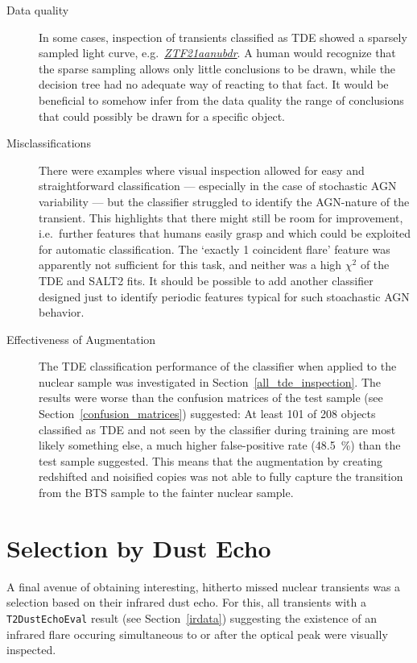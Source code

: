 \begin{description}
  \item[Data quality] In some cases, inspection of transients classified as TDE showed a sparsely sampled light curve, e.g.~\textit{\href{https://ztfnuclear.simeonreusch.com/transient/ZTF21aanubdr}{ZTF21aanubdr}}. A human would recognize that the sparse sampling allows only little conclusions to be drawn, while the decision tree had no adequate way of reacting to that fact. It would be beneficial to somehow infer from the data quality the range of conclusions that could possibly be drawn for a specific object.
  \item[Misclassifications] There were examples where visual inspection allowed for easy and straightforward classification --- especially in the case of stochastic AGN variability --- but the classifier struggled to identify the AGN-nature of the transient. This highlights that there might still be room for improvement, i.e.~further features that humans easily grasp and which could be exploited for automatic classification. The `exactly 1 coincident flare' feature was apparently not sufficient for this task, and neither was a high $\chi^2$ of the TDE and SALT2 fits. It should be possible to add another classifier designed just to identify periodic features typical for such stoachastic AGN behavior.
  \item[Effectiveness of Augmentation] The TDE classification performance of the classifier when applied to the nuclear sample was investigated in Section~\ref{all_tde_inspection}. The results were worse than the confusion matrices of the test sample (see Section~\ref{confusion_matrices}) suggested: At least 101 of 208 objects classified as TDE and not seen by the classifier during training are most likely something else, a much higher false-positive rate (\SI{48.5}{\percent}) than the test sample suggested. This means that the augmentation by creating redshifted and noisified copies was not able to fully capture the transition from the BTS sample to the fainter nuclear sample.
\end{description}

\section{Selection by Dust Echo}\label{dustecho_sel}
A final avenue of obtaining interesting, hitherto missed nuclear transients was a selection based on their infrared dust echo. For this, all transients with a \texttt{T2DustEchoEval} result (see Section~\ref{irdata}) suggesting the existence of an infrared flare occuring simultaneous to or after the optical peak were visually inspected.

